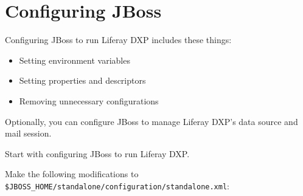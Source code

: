 \noindent\hrulefill

\section{Configuring JBoss}\label{configuring-jboss}

Configuring JBoss to run Liferay DXP includes these things:

\begin{itemize}
\tightlist
\item
  Setting environment variables
\item
  Setting properties and descriptors
\item
  Removing unnecessary configurations
\end{itemize}

Optionally, you can configure JBoss to manage Liferay DXP's data source
and mail session.

Start with configuring JBoss to run Liferay DXP.

Make the following modifications to
\texttt{\$JBOSS\_HOME/standalone/configuration/standalone.xml}:

